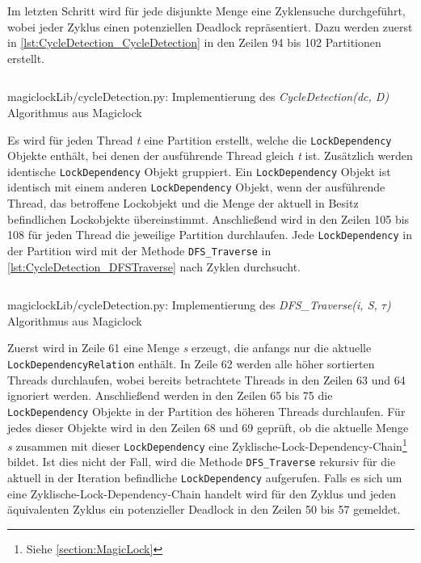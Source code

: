 Im letzten Schritt wird für jede disjunkte Menge eine Zyklensuche durchgeführt,
wobei jeder Zyklus einen potenziellen Deadlock repräsentiert. Dazu werden zuerst
in \cref{lst:CycleDetection_CycleDetection} in den Zeilen 94 bis 102 Partitionen
erstellt.
\begin{listing}[ht]
  \inputminted[frame=lines,linenos,firstline=78,lastline=108]{python}{./Python/magiclockLib/cycleDetection.py}
  \caption{magiclockLib/cycleDetection.py: Implementierung des \textit{CycleDetection(dc, D)} Algorithmus aus Magiclock\autocite[8]{MagicLock}}
  \label{lst:CycleDetection_CycleDetection}
\end{listing}
Es wird für jeden Thread \textit{t} eine Partition erstellt, welche die
\texttt{LockDependency} Objekte enthält, bei denen der ausführende Thread gleich
\textit{t} ist. Zusätzlich werden identische \texttt{LockDependency} Objekt
gruppiert. Ein \texttt{LockDependency} Objekt ist identisch mit einem anderen
\texttt{LockDependency} Objekt, wenn der ausführende Thread, das betroffene
Lockobjekt und die Menge der aktuell in Besitz befindlichen Lockobjekte
übereinstimmt. Anschließend wird in den Zeilen 105 bis 108 für jeden Thread die
jeweilige Partition durchlaufen. Jede \texttt{LockDependency} in der Partition
wird mit der Methode \texttt{DFS\_Traverse} in
\cref{lst:CycleDetection_DFSTraverse} nach Zyklen durchsucht.
\begin{listing}[ht]
  \inputminted[frame=lines,linenos,firstline=50,lastline=75]{python}{./Python/magiclockLib/cycleDetection.py}
  \caption{magiclockLib/cycleDetection.py: Implementierung des \textit{DFS\_Traverse(i, S, $\tau$)} Algorithmus aus Magiclock\autocite[8]{MagicLock}}
  \label{lst:CycleDetection_DFSTraverse}
\end{listing}
Zuerst wird in Zeile 61 eine Menge \textit{s} erzeugt, die anfangs nur die
aktuelle \texttt{LockDependencyRelation} enthält. In Zeile 62 werden alle höher
sortierten Threads durchlaufen, wobei bereits betrachtete Threads in den Zeilen
63 und 64 ignoriert werden. Anschließend werden in den Zeilen 65 bis 75 die
\texttt{LockDependency} Objekte in der Partition des höheren Threads
durchlaufen. Für jedes dieser Objekte wird in den Zeilen 68 und 69 geprüft, ob
die aktuelle Menge \textit{s} zusammen mit dieser \texttt{LockDependency} eine
Zyklische-Lock-Dependency-Chain\footnote{Siehe \cref{section:MagicLock}} bildet.
Ist dies nicht der Fall, wird die Methode \texttt{DFS\_Traverse} rekursiv für
die aktuell in der Iteration befindliche \texttt{LockDependency} aufgerufen.
Falls es sich um eine Zyklische-Lock-Dependency-Chain handelt wird für den
Zyklus und jeden äquivalenten Zyklus ein potenzieller Deadlock in den Zeilen 50
bis 57 gemeldet.